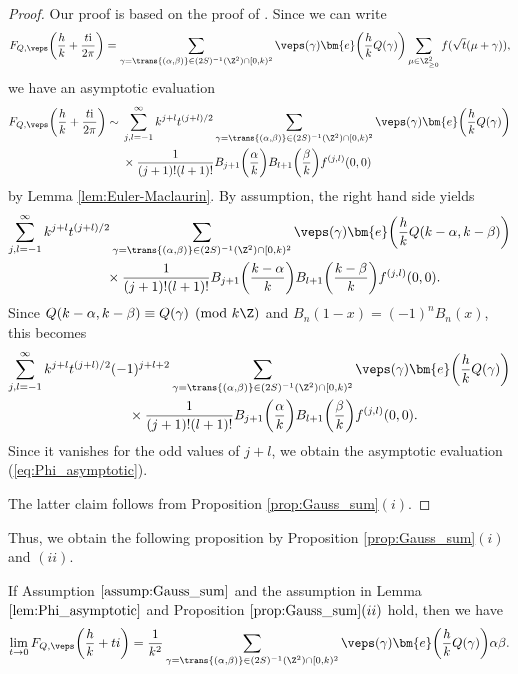 \begin{proof}
	Our proof is based on the proof of \cite[Lemma 3.2]{BMM}.
	Since we can write
	\begin{gather*}
	F_{Q, \veps} \bigg( \frac{h}{k} + \frac{t{\rm i}}{2\pi} \bigg)
	=
	\sum_{\gamma = \trans{(\alpha, \beta)} \in (2S)^{-1}(\Z^2) \cap [0, k)^2} \veps(\gamma) \bm{e}\bigg(\frac{h}{k} Q(\gamma)\bigg)
	\sum_{\mu \in \Z_{\ge 0}^2} f(\sqrt{t}(\mu + \gamma)),
	\end{gather*}
	we have an asymptotic evaluation
	\begin{align*}
		F_{Q, \veps} \bigg( \frac{h}{k} + \frac{t{\rm i}}{2\pi} \bigg)
\sim{} &\sum_{j,l = -1}^{\infty} k^{j+l} t^{(j+l)/2}
\sum_{\gamma = \trans{(\alpha, \beta)} \in (2S)^{-1}(\Z^2) \cap [0, k)^2} \veps(\gamma) \bm{e}\bigg(\frac{h}{k} Q(\gamma)\bigg)
\\
		&\times\frac{1}{(j+1)! (l+1)!} B_{j+1}\bigg( \frac{\alpha}{k} \bigg) B_{l+1}\bigg( \frac{\beta}{k} \bigg) f^{(j, l)}(0, 0)
	\end{align*}
	by Lemma \ref{lem:Euler-Maclaurin}.
	By assumption, the right hand side yields
	\begin{gather*}
		\sum_{j,l = -1}^{\infty} k^{j+l} t^{(j+l)/2}
		\sum_{\gamma = \trans{(\alpha, \beta)} \in (2S)^{-1}(\Z^2) \cap [0, k)^2} \veps(\gamma) \bm{e}\bigg( \frac{h}{k} Q(k - \alpha, k - \beta) \bigg)
\\ \qquad
		{}\times\frac{1}{(j+1)! (l+1)!} B_{j+1}\bigg( \frac{k - \alpha}{k} \bigg) B_{l+1}\bigg( \frac{k - \beta}{k} \bigg) f^{(j, l)}(0, 0).
	\end{gather*}
	Since $ Q(k - \alpha, k - \beta) \equiv Q(\gamma) \pmod{k\Z} $ and $ B_n(1-x) = (-1)^n B_n(x) $, this becomes
	\begin{gather*}
		\sum_{j,l = -1}^{\infty} k^{j+l} t^{(j+l)/2} (-1)^{j+l+2}
		\sum_{\gamma = \trans{(\alpha, \beta)} \in (2S)^{-1}(\Z^2) \cap [0, k)^2} \veps(\gamma) \bm{e}\bigg(\frac{h}{k} Q(\gamma)\bigg)
\\ \qquad
		{}\times\frac{1}{(j+1)! (l+1)!} B_{j+1}\bigg( \frac{\alpha}{k} \bigg) B_{l+1}\bigg( \frac{\beta}{k} \bigg) f^{(j, l)}(0, 0).
	\end{gather*}
	Since it vanishes for the odd values of $ j+l $, we obtain the asymptotic evaluation (\ref{eq:Phi_asymptotic}).
	
	The latter claim follows from Proposition \ref{prop:Gauss_sum}$(i)$.
\end{proof}

Thus, we obtain the following proposition by Proposition \ref{prop:Gauss_sum}$(i)$ and $(ii)$.

\begin{prop} \label{prop:Phi_lim}
	If Assumption $ \ref{assump:Gauss_sum} $ and the assumption in Lemma $ \ref{lem:Phi_asymptotic} $ and Proposition $ \ref{prop:Gauss_sum}(ii)$ hold, then we have\vspace{-.5ex}
	\begin{gather*}
		\lim_{t \to 0} F_{Q, \veps} \bigg( \frac{h}{k} + ti \bigg)
		= \frac{1}{k^2}
		\sum_{\gamma = \trans{(\alpha, \beta)} \in (2S)^{-1}(\Z^2) \cap [0, k)^2} \veps(\gamma) \bm{e}\bigg(\frac{h}{k} Q(\gamma)\bigg)
		\alpha \beta.
	\end{gather*}
\end{prop}
